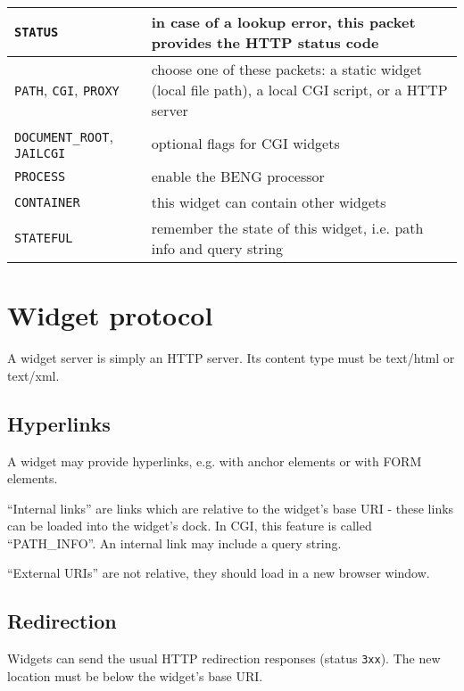 \documentclass[a4paper,12pt]{article}
\begin{document}
\begin{tabular}{|l|p{10cm}|}
\hline
\texttt{STATUS} & in case of a lookup error, this packet provides the
HTTP status code \\
\hline

\texttt{PATH}, \texttt{CGI}, \texttt{PROXY} & choose one of these
packets: a static widget (local file path), a local CGI script, or a
HTTP server \\

\hline

\texttt{DOCUMENT\_ROOT}, \texttt{JAILCGI} & optional flags for CGI
widgets \\

\hline
\texttt{PROCESS} & enable the BENG processor \\
\hline
\texttt{CONTAINER} & this widget can contain other widgets \\
\hline

\texttt{STATEFUL} & remember the state of this widget, i.e. path info
and query string \\

\hline
\end{tabular}


\section{Widget protocol}

A widget server is simply an HTTP server.  Its content type must be
text/html or text/xml.


\subsection{Hyperlinks}

A widget may provide hyperlinks, e.g. with anchor elements or with
FORM elements.

``Internal links'' are links which are relative to the widget's base
URI - these links can be loaded into the widget's dock.  In CGI, this
feature is called ``PATH\_INFO''.  An internal link may include a
query string.

``External URIs'' are not relative, they should
load in a new browser window.

\subsection{Redirection}

Widgets can send the usual HTTP redirection responses (status
\texttt{3xx}).  The new location must be below the widget's base URI.
\end{document}
